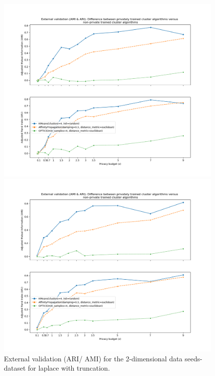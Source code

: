{\begin{figure}[H]
\begin{minipage}[c]{0.49\textwidth}
            \includegraphics[width=1\textwidth]{Results/2d-laplace-truncated/seeds-dataset/ami-and-ari.png}
            \caption{External validation (ARI/ AMI) for the 2-dimensional data seeds-dataset for laplace with truncation.}
            \label{fig:appendix-external-validation-seeds-dataset_comparison_2d-laplace-truncated}
        \end{minipage}
        \begin{minipage}[c]{0.49\textwidth}
            \includegraphics[width=1\textwidth]{Results/2d-laplace-optimal-truncated/seeds-dataset/ami-and-ari.png}

\end{minipage}
\end{figure}}
